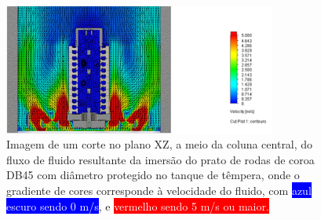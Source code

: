 \begin{figure}[htb]
    \centering
    \includegraphics[width = 0.8\textwidth]{Figures/Cap3/resultado_simples.png}
    \caption[Resultado da simulação CFD da têmpera das rodas de coroa com diâmetro protegido]%
    {Imagem de um corte no plano XZ, a meio da coluna central, do fluxo de fluido resultante da imersão do prato de rodas de coroa DB45 com diâmetro protegido no tanque de têmpera, onde o gradiente de cores corresponde à velocidade do fluido, com \colorbox{Blue}{\textcolor{White}{azul escuro sendo 0 m/s}}, e \colorbox{Red}{\textcolor{White}{vermelho sendo 5 m/s ou maior.}}}
    \label{fig:resultado_simples}
\end{figure}
\newpage
